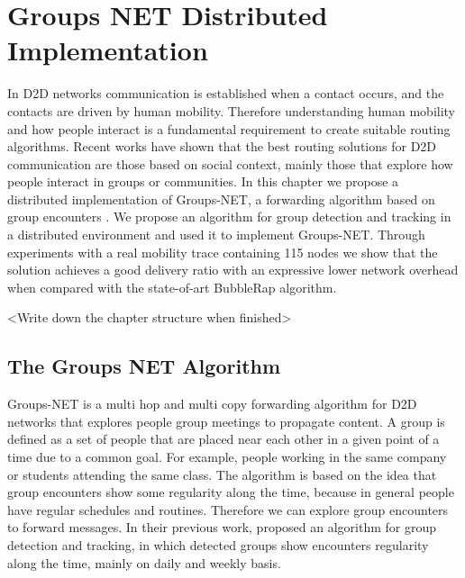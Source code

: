 \chapter{Groups NET Distributed Implementation}
\label{ch:GroupsNet}

In D2D networks communication is established when a contact occurs, and the contacts are driven by human mobility. Therefore understanding human mobility and how people interact is a fundamental requirement to create suitable routing algorithms. Recent works have shown that the best routing solutions for D2D communication are those based on social context, mainly those that explore how people interact in groups or communities. In this chapter we propose a distributed implementation of Groups-NET, a forwarding algorithm based on group encounters \citep{nunes2016leveraging}. We propose an algorithm for group detection and tracking in a distributed environment and used it to implement Groups-NET. Through experiments with a real mobility trace containing 115 nodes we show that the solution achieves a good delivery ratio with an expressive lower network overhead when compared with the state-of-art BubbleRap algorithm.

<Write down the chapter structure when finished>

\section{The Groups NET Algorithm}
\label{sec:groupsNet}

Groups-NET is a multi hop and multi copy forwarding algorithm for D2D networks that explores people group meetings to propagate content. A group is defined as a set of people that are placed near each other in a given point of a time due to a common goal. For example, people working in the same company or students attending the same class. The algorithm is based on the idea that group encounters show some regularity along the time, because in general people have regular schedules and routines. Therefore we can explore group encounters to forward messages. In their previous work, \citet{groupMobility} proposed an algorithm for group detection and tracking, in which detected groups show encounters regularity along the time, mainly on daily and weekly basis.

